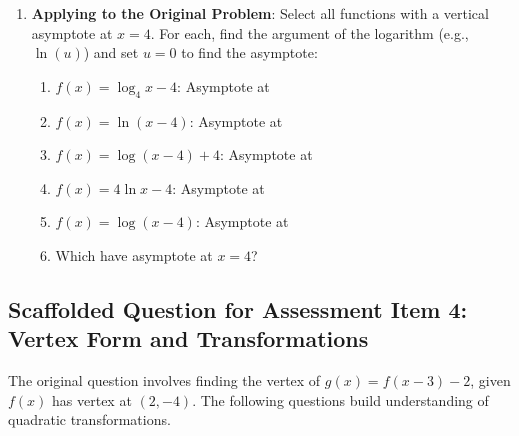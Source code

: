 \documentclass[12pt]{article}
\begin{document}
\begin{enumerate}[label=2.\arabic*]
    \item \textbf{Applying to the Original Problem}: Select all functions with a vertical asymptote at \( x = 4 \). For each, find the argument of the logarithm (e.g., \( \ln(u) \)) and set \( u = 0 \) to find the asymptote:
    \begin{enumerate}[label=\alph*)]
        \item \( f(x) = \log_4 x - 4 \): Asymptote at \underline{\hspace{2cm}}
        \item \( f(x) = \ln(x - 4) \): Asymptote at \underline{\hspace{2cm}}
        \item \( f(x) = \log(x - 4) + 4 \): Asymptote at \underline{\hspace{2cm}}
        \item \( f(x) = 4 \ln x - 4 \): Asymptote at \underline{\hspace{2cm}}
        \item \( f(x) = \log(x - 4) \): Asymptote at \underline{\hspace{2cm}}
        \item Which have asymptote at \( x = 4 \)? \underline{\hspace{3cm}}
    \end{enumerate}
\end{enumerate}

\subsection*{Scaffolded Question for Assessment Item 4: Vertex Form and Transformations}
The original question involves finding the vertex of \( g(x) = f(x - 3) - 2 \), given \( f(x) \) has vertex at \( (2, -4) \). The following questions build understanding of quadratic transformations.
\end{document}
